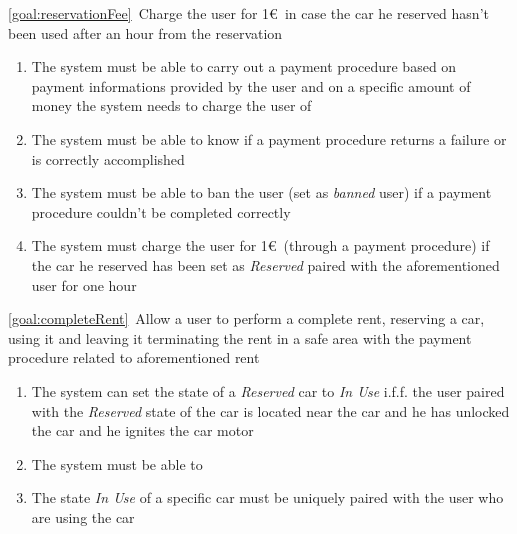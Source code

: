\begin{description}
  		\item \ref{goal:reservationFee}\ Charge the user for 1\euro\ in case the car he reserved hasn't
  		been used after an hour from the reservation
  			\begin{enumerate}[resume*]
  				\item The system must be able to carry out a payment procedure based on payment
  				informations provided by the user and on a specific amount of money the system needs to
  				charge the user of
  				\item The system must be able to know if a payment procedure returns a failure or is
  				correctly accomplished
  				\item The system must be able to ban the user (set as \textit{banned} user) if a payment
  				procedure couldn't be completed correctly
  				\item The system must charge the user for 1\euro\ (through a payment procedure) if the
  				car he reserved has been set as \textit{Reserved} paired with the aforementioned user for
  				one hour
   			\end{enumerate}
  		\item \ref{goal:completeRent}\ Allow a user to perform a complete rent, reserving a car, using
  		it and leaving it terminating the rent in a safe area with the payment procedure related to
  		aforementioned rent 
  			\begin{enumerate}[resume*]
  				\item The system can set the state of a \textit{Reserved} car to \textit{In Use} i.f.f. the
  				user paired with the \textit{Reserved} state of the car is located near the car and he has
  				unlocked the car and he ignites the car motor
  				\item The system must be able to 
  				\item The state \textit{In Use} of a specific car must be uniquely paired with the user who
  				are using the car
  				

\end{enumerate}
\end{description}
